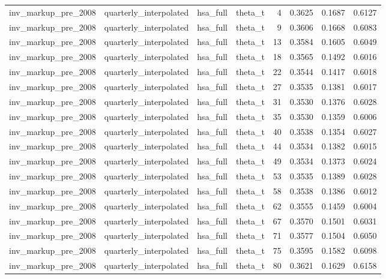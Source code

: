 \begin{tabular}{llllrrrr}
inv\_markup\_pre\_2008 & quarterly\_interpolated & hsa\_full & theta\_t & 4 & 0.3625 & 0.1687 & 0.6127 \\
inv\_markup\_pre\_2008 & quarterly\_interpolated & hsa\_full & theta\_t & 9 & 0.3606 & 0.1668 & 0.6083 \\
inv\_markup\_pre\_2008 & quarterly\_interpolated & hsa\_full & theta\_t & 13 & 0.3584 & 0.1605 & 0.6049 \\
inv\_markup\_pre\_2008 & quarterly\_interpolated & hsa\_full & theta\_t & 18 & 0.3565 & 0.1492 & 0.6016 \\
inv\_markup\_pre\_2008 & quarterly\_interpolated & hsa\_full & theta\_t & 22 & 0.3544 & 0.1417 & 0.6018 \\
inv\_markup\_pre\_2008 & quarterly\_interpolated & hsa\_full & theta\_t & 27 & 0.3535 & 0.1381 & 0.6017 \\
inv\_markup\_pre\_2008 & quarterly\_interpolated & hsa\_full & theta\_t & 31 & 0.3530 & 0.1376 & 0.6028 \\
inv\_markup\_pre\_2008 & quarterly\_interpolated & hsa\_full & theta\_t & 35 & 0.3530 & 0.1359 & 0.6006 \\
inv\_markup\_pre\_2008 & quarterly\_interpolated & hsa\_full & theta\_t & 40 & 0.3538 & 0.1354 & 0.6027 \\
inv\_markup\_pre\_2008 & quarterly\_interpolated & hsa\_full & theta\_t & 44 & 0.3534 & 0.1382 & 0.6015 \\
inv\_markup\_pre\_2008 & quarterly\_interpolated & hsa\_full & theta\_t & 49 & 0.3534 & 0.1373 & 0.6024 \\
inv\_markup\_pre\_2008 & quarterly\_interpolated & hsa\_full & theta\_t & 53 & 0.3535 & 0.1389 & 0.6028 \\
inv\_markup\_pre\_2008 & quarterly\_interpolated & hsa\_full & theta\_t & 58 & 0.3538 & 0.1386 & 0.6012 \\
inv\_markup\_pre\_2008 & quarterly\_interpolated & hsa\_full & theta\_t & 62 & 0.3555 & 0.1459 & 0.6004 \\
inv\_markup\_pre\_2008 & quarterly\_interpolated & hsa\_full & theta\_t & 67 & 0.3570 & 0.1501 & 0.6031 \\
inv\_markup\_pre\_2008 & quarterly\_interpolated & hsa\_full & theta\_t & 71 & 0.3577 & 0.1504 & 0.6050 \\
inv\_markup\_pre\_2008 & quarterly\_interpolated & hsa\_full & theta\_t & 75 & 0.3595 & 0.1582 & 0.6098 \\
inv\_markup\_pre\_2008 & quarterly\_interpolated & hsa\_full & theta\_t & 80 & 0.3621 & 0.1629 & 0.6158 \\

\end{tabular}
